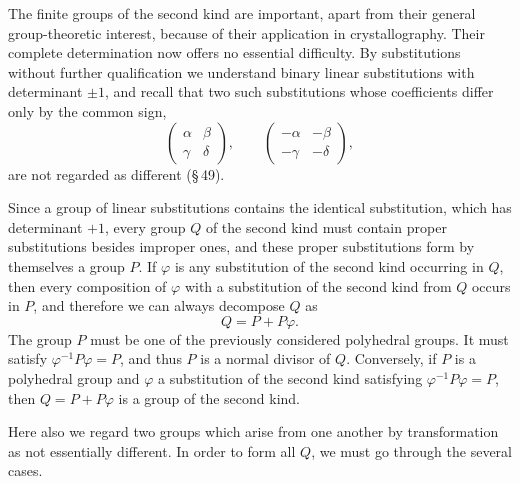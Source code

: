 \documentclass[11pt]{article}
\begin{document}
The finite groups of the second kind are important, apart from their general group-theoretic interest, because of their application in crystallography. Their complete determination now offers no essential difficulty. By substitutions without further qualification we understand binary linear substitutions with determinant $\pm1$, and recall that two such substitutions whose coefficients differ only by the common sign,
\[
 \begin{pmatrix}\alpha&\beta\\ \gamma&\delta\end{pmatrix},\qquad
 \begin{pmatrix}-\alpha&-\beta\\ -\gamma&-\delta\end{pmatrix},
\]
are not regarded as different (\S\,49).

Since a group of linear substitutions contains the identical substitution, which has determinant $+1$, every group $Q$ of the second kind must contain proper substitutions besides improper ones, and these proper substitutions form by themselves a group $P$. If $\varphi$ is any substitution of the second kind occurring in $Q$, then every composition of $\varphi$ with a substitution of the second kind from $Q$ occurs in $P$, and therefore we can always decompose $Q$ as
\begin{equation}
 Q=P+P\varphi . \tag{1}
\end{equation}
The group $P$ must be one of the previously considered polyhedral groups. It must satisfy $\varphi^{-1}P\varphi=P$, and thus $P$ is a normal divisor of $Q$. Conversely, if $P$ is a polyhedral group and $\varphi$ a substitution of the second kind satisfying $\varphi^{-1}P\varphi=P$, then $Q=P+P\varphi$ is a group of the second kind.

Here also we regard two groups which arise from one another by transformation as not essentially different. In order to form all $Q$, we must go through the several cases.
\end{document}
